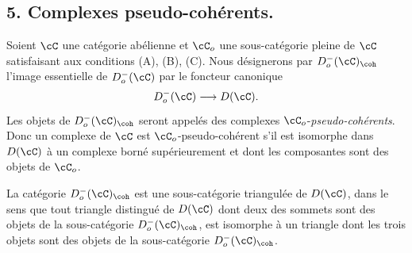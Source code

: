 \subsection*{5. Complexes pseudo-cohérents.}

Soient $\cC$ une catégorie abélienne et $\cC_o$ une sous-catégorie pleine de $\cC$ satisfaisant aux conditions (A), (B), (C). Nous désignerons par $D_o^-(\cC)_{\coh}$ l'image essentielle de $D_o^-(\cC)$ par le foncteur canonique
\[
D_o^-(\cC)\longrightarrow D(\cC).
\]
Les objets de $D_o^-(\cC)_{\coh}$ seront appelés des complexes $\cC_o$-\emph{pseudo-cohérents}. Donc un complexe de $\cC$ est $\cC_o$-pseudo-cohérent s'il est isomorphe dans $D(\cC)$ à un complexe borné supérieurement et dont les composantes sont des objets de $\cC_o$.

La catégorie $D_o^-(\cC)_{\coh}$ est une sous-catégorie triangulée de $D(\cC)$, dans le sens que tout triangle distingué de $D(\cC)$ dont deux des sommets sont des objets de la sous-catégorie $D_o^-(\cC)_{\coh}$, est isomorphe à un triangle dont les trois objets sont des objets de la sous-catégorie $D_o^-(\cC)_{\coh}$.

